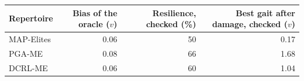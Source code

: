 \begin{tabular}{lrrr}
\toprule
Repertoire & Bias of the oracle ($v$) & Resilience, checked (\%) & Best gait after damage, checked ($v$) \\
\midrule
MAP-Elites & 0.06 & 50 & 0.17 \\
PGA-ME & 0.08 & 66 & 1.68 \\
DCRL-ME & 0.06 & 60 & 1.04 \\
\bottomrule
\end{tabular}
